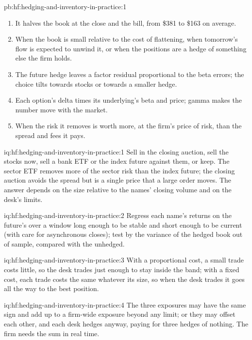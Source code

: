\begin{solution}{pb:hf:hedging-and-inventory-in-practice:1}
\begin{enumerate}
overnight.
\item It halves the book at the close and the bill, from \$381 to \$163 on average.
\item When the book is small relative to the cost of flattening, when tomorrow's flow is expected to unwind it, or when the positions are a hedge of
something else the firm holds.
\item The future hedge leaves a factor residual proportional to the beta errors; the choice tilts towards stocks or towards a smaller hedge.
\item Each option's delta times its underlying's beta and price; gamma makes the number move with the market.
\item When the risk it removes is worth more, at the firm's price of risk, than the spread and fees it pays.
\end{enumerate}
\end{solution}

\begin{solution}{iq:hf:hedging-and-inventory-in-practice:1}
Sell in the closing auction, sell the stocks now, sell a bank ETF or the index future against them, or keep. The sector ETF removes more of the
sector risk than the index future; the closing auction avoids the spread but is a single price that a large order moves. The answer depends on the
size relative to the names' closing volume and on the desk's limits.
\end{solution}

\begin{solution}{iq:hf:hedging-and-inventory-in-practice:2}
Regress each name's returns on the future's over a window long enough to be stable and short enough to be current (with care for asynchronous
closes); test by the variance of the hedged book out of sample, compared with the unhedged.
\end{solution}

\begin{solution}{iq:hf:hedging-and-inventory-in-practice:3}
With a proportional cost, a small trade costs little, so the desk trades just enough to stay inside the band; with a fixed cost, each trade costs
the same whatever its size, so when the desk trades it goes all the way to the best position.
\end{solution}

\begin{solution}{iq:hf:hedging-and-inventory-in-practice:4}
The three exposures may have the same sign and add up to a firm-wide exposure beyond any limit; or they may offset each other, and each desk hedges
anyway, paying for three hedges of nothing. The firm needs the sum in real time.
\end{solution}

